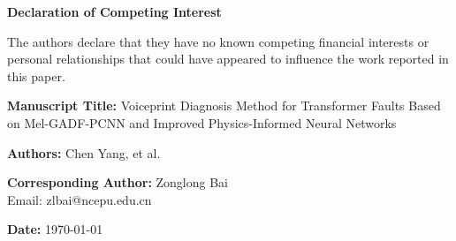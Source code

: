 \documentclass[12pt,a4paper]{article}
\begin{document}
	
	\begin{center}
		\Large\textbf{Declaration of Competing Interest}
	\end{center}
	\vspace{1cm}
	
	The authors declare that they have no known competing financial interests or personal relationships 
	that could have appeared to influence the work reported in this paper.
	
	\vspace{2cm}
	
	\noindent
	\textbf{Manuscript Title:} Voiceprint Diagnosis Method for Transformer Faults Based on Mel-GADF-PCNN and Improved Physics-Informed Neural Networks
	
	\vspace{0.8cm}
	\noindent
	\textbf{Authors:} Chen Yang, et al.
	
	\vspace{0.8cm}
	\noindent
	\textbf{Corresponding Author:} Zonglong Bai \\
	Email: zlbai@ncepu.edu.cn
	
	\vfill
	\noindent
	\textbf{Date:} \today
	
\end{document}
